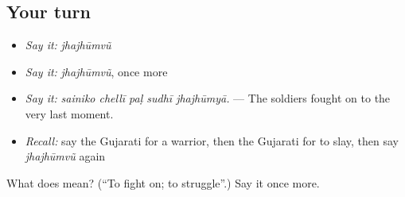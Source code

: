 \subsection*{Your turn}
\begin{itemize}
\raggedright
  \item \emph{Say it:} \emph{jhajhūmvũ}
  \item \emph{Say it:} \emph{jhajhūmvũ}, once more
  \item \emph{Say it:} \emph{sainiko chellī paḷ sudhī jhajhūmyā.} — The soldiers fought on to the very last moment.
  \item \emph{Recall:} say the Gujarati for a warrior, then the Gujarati for to slay, then say \emph{jhajhūmvũ} again
\end{itemize}

\begin{tcolorbox}[breakable,colback=teal!4,colframe=teal!35!black,title={Before you move on}]
What does  mean? (\textquotedblleft{}To fight on; to struggle\textquotedblright{}.) Say it once more.
\end{tcolorbox}
